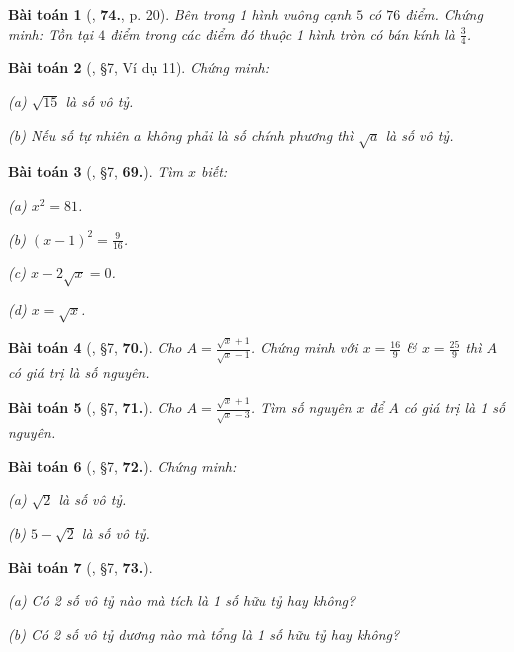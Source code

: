\documentclass{article}
\numberwithin{equation}{section}
\newtheorem{baitoan}{Bài toán}
\begin{document}
\begin{baitoan}[\cite{Tuyen_Toan_7}, \textbf{74.}, p. 20]
	Bên trong 1 hình vuông cạnh $5$ có $76$ điểm. Chứng minh: Tồn tại $4$ điểm trong các điểm đó thuộc 1 hình tròn có bán kính là $\frac{3}{4}$.
\end{baitoan}

\begin{baitoan}[\cite{Binh_Toan_7_tap_1}, \S7, Ví dụ 11]
	Chứng minh:
	\begin{enumerate*}
		\item[(a)] $\sqrt{15}$ là số vô tỷ.
		\item[(b)] Nếu số tự nhiên $a$ không phải là số chính phương thì $\sqrt{a}$ là số vô tỷ.
	\end{enumerate*}
\end{baitoan}

\begin{baitoan}[\cite{Binh_Toan_7_tap_1}, \S7, \textbf{69.}]
	Tìm $x$ biết:
	\begin{enumerate*}
		\item[(a)] $x^2 = 81$.
		\item[(b)] $(x - 1)^2 = \frac{9}{16}$.
		\item[(c)] $x - 2\sqrt{x} = 0$.
		\item[(d)] $x = \sqrt{x}$.
	\end{enumerate*}
\end{baitoan}

\begin{baitoan}[\cite{Binh_Toan_7_tap_1}, \S7, \textbf{70.}]
	Cho $A = \frac{\sqrt{x} + 1}{\sqrt{x} - 1}$. Chứng minh với $x = \frac{16}{9}$ \& $x = \frac{25}{9}$ thì $A$ có giá trị là số nguyên.
\end{baitoan}

\begin{baitoan}[\cite{Binh_Toan_7_tap_1}, \S7, \textbf{71.}]
	Cho $A = \frac{\sqrt{x} + 1}{\sqrt{x} - 3}$. Tìm số nguyên $x$ để $A$ có giá trị là 1 số nguyên.
\end{baitoan}

\begin{baitoan}[\cite{Binh_Toan_7_tap_1}, \S7, \textbf{72.}]
	Chứng minh:
	\begin{enumerate*}
		\item[(a)] $\sqrt{2}$ là số vô tỷ.
		\item[(b)] $5 - \sqrt{2}$ là số vô tỷ.
	\end{enumerate*}
\end{baitoan}

\begin{baitoan}[\cite{Binh_Toan_7_tap_1}, \S7, \textbf{73.}]
	\begin{enumerate*}
		\item[(a)] Có 2 số vô tỷ nào mà tích là 1 số hữu tỷ hay không?
		\item[(b)] Có 2 số vô tỷ dương nào mà tổng là 1 số hữu tỷ hay không?
	\end{enumerate*}
\end{baitoan}
\end{document}

